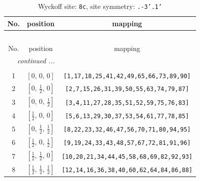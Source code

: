\documentclass[fleqn,8pt]{jsarticle}
\begin{document}
\begin{longtable}{ccc}
\caption{Wyckoff site: {\tt 8c}, site symmetry: {\tt .-3'.1'}}
 \\
 \hline \hline
No. & position & mapping \\ \hline \endfirsthead

\multicolumn{2}{l}{\tablename\ \thetable{}} \\
 \hline \hline
No. & position & mapping \\ \hline \endhead

 \hline \hline
\multicolumn{2}{r}{\footnotesize\it continued ...} \\ \endfoot

 \hline \hline
\multicolumn{2}{r}{} \\ \endlastfoot

1 & $\left[ 0,\, 0,\, 0 \right]$ & {\tt [1,17,18,25,41,42,49,65,66,73,89,90]} \\ \hline
2 & $\left[ 0,\, \frac{1}{2},\, 0 \right]$ & {\tt [2,7,15,26,31,39,50,55,63,74,79,87]} \\ \hline
3 & $\left[ 0,\, 0,\, \frac{1}{2} \right]$ & {\tt [3,4,11,27,28,35,51,52,59,75,76,83]} \\ \hline
4 & $\left[ \frac{1}{2},\, 0,\, 0 \right]$ & {\tt [5,6,13,29,30,37,53,54,61,77,78,85]} \\ \hline
5 & $\left[ 0,\, \frac{1}{2},\, \frac{1}{2} \right]$ & {\tt [8,22,23,32,46,47,56,70,71,80,94,95]} \\ \hline
6 & $\left[ \frac{1}{2},\, 0,\, \frac{1}{2} \right]$ & {\tt [9,19,24,33,43,48,57,67,72,81,91,96]} \\ \hline
7 & $\left[ \frac{1}{2},\, \frac{1}{2},\, 0 \right]$ & {\tt [10,20,21,34,44,45,58,68,69,82,92,93]} \\ \hline
8 & $\left[ \frac{1}{2},\, \frac{1}{2},\, \frac{1}{2} \right]$ & {\tt [12,14,16,36,38,40,60,62,64,84,86,88]} \\
\end{longtable}
\renewcommand{\arraystretch}{1.2}
\end{document}
